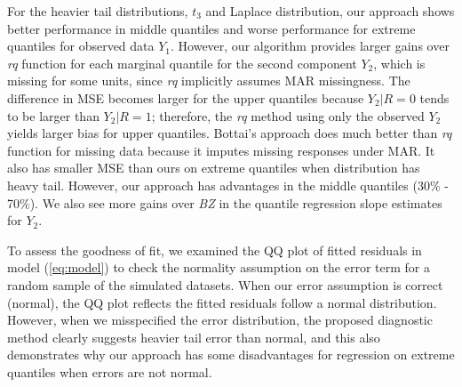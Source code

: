 \documentclass[useAMS,usenatbib,referee]{biom}
\begin{document}
For the heavier tail distributions, $t_3$ and Laplace distribution,
our approach shows better performance in middle quantiles and worse
performance for extreme quantiles for observed data $Y_1$. However,
our algorithm provides larger gains over \textit{rq} function for each
marginal quantile for the second component $Y_2$, which is missing for
some units, since \textit{rq} implicitly assumes MAR missingness.  The
difference in MSE becomes larger for the upper quantiles because $Y_2
|R = 0$ tends to be larger than $Y_2 | R = 1$; therefore, the
\textit{rq} method using only the observed $Y_2$ yields larger bias
for upper quantiles. Bottai's approach does much better than
\textit{rq} function for missing data because it imputes missing
responses under MAR.  It also has smaller MSE than ours on extreme
quantiles when distribution has heavy tail. However, our approach has
advantages in the middle quantiles (30\% - 70\%).  We also see more
gains over \textit{BZ} in the quantile regression slope estimates for
$Y_2$.

To assess the goodness of fit, we examined the QQ plot of fitted
residuals in model (\ref{eq:model}) to check the normality assumption
on the error term for a random sample of the simulated datasets.
When our error assumption is correct
(normal), the QQ plot reflects the fitted residuals follow  a
normal distribution. However, when we misspecified the error
distribution, the proposed diagnostic method clearly suggests
heavier tail error than normal, and this also demonstrates why our
approach has some disadvantages for regression on extreme quantiles
when errors are not normal.
\end{document}
